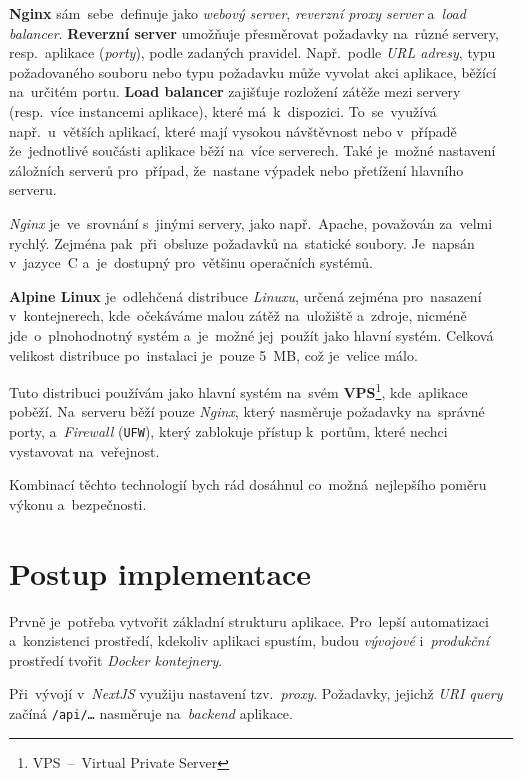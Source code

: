 \documentclass[11pt,a4paper]{report}
\begin{document}
            \textbf{Nginx} sám~sebe~definuje jako \emph{webový server}, \emph{reverzní proxy server} a~\emph{load balancer}. \textbf{Reverzní server} umožňuje přesměrovat požadavky na~různé servery, resp.~aplikace (\emph{porty}), podle zadaných pravidel. Např.~podle \emph{URL adresy}, typu požadovaného souboru nebo typu požadavku může vyvolat akci aplikace, běžící na~určitém portu. \textbf{Load balancer} zajišťuje rozložení zátěže mezi servery (resp.~více instancemi aplikace), které má~k~dispozici. To~se~využívá např.~u~větších aplikací, které mají vysokou návštěvnost nebo v~případě že~jednotlivé součásti aplikace běží na~více serverech. Také je~možné nastavení záložních serverů pro~případ, že~nastane výpadek nebo přetížení hlavního serveru.
            
            \emph{Nginx} je~ve~srovnání s~jinými servery, jako např.~Apache, považován za~velmi rychlý. Zejména pak~při~obsluze požadavků na~statické soubory. Je~napsán v~jazyce~C a~je~dostupný pro~většinu operačních systémů. \cite{WhatNGINX}

            \textbf{Alpine Linux} je~odlehčená distribuce \emph{Linuxu}, určená zejména pro~nasazení v~kontejnerech, kde~očekáváme malou zátěž na~uložiště a~zdroje, nicméně jde~o~plnohodnotný systém a~je~možné jej~použít jako hlavní systém. Celková velikost distribuce po~instalaci je~pouze 5~MB, což je~velice málo.

            Tuto distribuci používám jako hlavní systém na~svém \textbf{VPS}\footnote{VPS~--~Virtual Private Server}, kde~aplikace poběží. Na~serveru běží pouze \emph{Nginx}, který nasměruje požadavky na~správné porty, a~\emph{Firewall} (\texttt{UFW}), který zablokuje přístup k~portům, které nechci vystavovat na~veřejnost.

            Kombinací těchto technologií bych rád dosáhnul co~možná~nejlepšího poměru výkonu a~bezpečnosti.
	
	\chapter{Postup implementace}
        Prvně je~potřeba vytvořit základní strukturu aplikace. Pro~lepší automatizaci a~konzistenci prostředí, kdekoliv aplikaci spustím, budou \emph{vývojové} i~\emph{produkční} prostředí tvořit \emph{Docker kontejnery}.

        Při~vývojí v~\emph{NextJS} využiju nastavení tzv.~\emph{proxy}. Požadavky, jejichž \emph{URI query} začíná \texttt{/api/\dots} nasměruje na~\emph{backend} aplikace.
        
\end{document}

